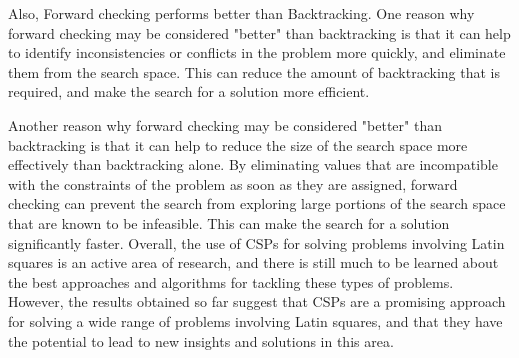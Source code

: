 \documentclass[14pt]{scrartcl} %
\begin{document}
Also, Forward checking  performs better than Backtracking. One reason why forward checking may be considered "better" than backtracking is that it can help to identify inconsistencies or conflicts in the problem more quickly, and eliminate them from the search space. This can reduce the amount of backtracking that is required, and make the search for a solution more efficient.

Another reason why forward checking may be considered "better" than backtracking is that it can help to reduce the size of the search space more effectively than backtracking alone. By eliminating values that are incompatible with the constraints of the problem as soon as they are assigned, forward checking can prevent the search from exploring large portions of the search space that are known to be infeasible. This can make the search for a solution significantly faster.
Overall, the use of CSPs for solving problems involving Latin squares is an active area of research, and there is still much to be learned about the best approaches and algorithms for tackling these types of problems. However, the results obtained so far suggest that CSPs are a promising approach for solving a wide range of problems involving Latin squares, and that they have the potential to lead to new insights and solutions in this area.
 
\end{document}
